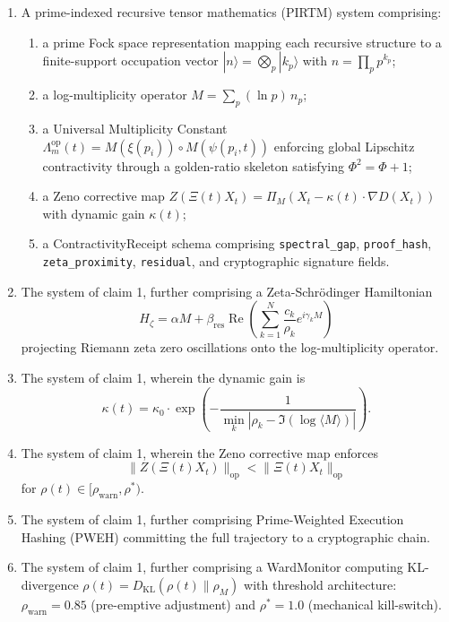 \documentclass[12pt]{article}
\theoremstyle{plain}
\theoremstyle{definition}
\theoremstyle{remark}
\begin{document}
\begin{enumerate}
    \item A prime-indexed recursive tensor mathematics (PIRTM) system comprising:
    \begin{enumerate}
        \item a prime Fock space representation mapping each recursive structure to a finite-support occupation vector $|n\rangle = \bigotimes_{p} |k_p\rangle$ with $n = \prod_{p} p^{k_p}$;
        \item a log-multiplicity operator $M = \sum_{p} (\ln p)\, n_p$;
        \item a Universal Multiplicity Constant $\Lambda_m^{\text{op}}(t) = M(\xi(p_i)) \circ M(\psi(p_i, t))$ enforcing global Lipschitz contractivity through a golden-ratio skeleton satisfying $\Phi^2 = \Phi + 1$;
        \item a Zeno corrective map $Z(\Xi(t)X_t) = \Pi_M(X_t - \kappa(t)\cdot \nabla D(X_t))$ with dynamic gain $\kappa(t)$;
        \item a ContractivityReceipt schema comprising \texttt{spectral\_gap}, \texttt{proof\_hash}, \texttt{zeta\_proximity}, \texttt{residual}, and cryptographic signature fields.
    \end{enumerate}

    \item The system of claim 1, further comprising a Zeta-Schrödinger Hamiltonian
    \[
    H_\zeta = \alpha M + \beta_{\text{res}} \operatorname{Re}\left( \sum_{k=1}^N \frac{c_k}{\rho_k} e^{i\gamma_k M} \right)
    \]
    projecting Riemann zeta zero oscillations onto the log-multiplicity operator.

    \item The system of claim 1, wherein the dynamic gain is
    \[
    \kappa(t) = \kappa_0 \cdot \exp\left( -\frac{1}{\min_k |\rho_k - \Im(\log \langle M \rangle)|} \right).
    \]

    \item The system of claim 1, wherein the Zeno corrective map enforces
    \[
    \|Z(\Xi(t)X_t)\|_{\text{op}} < \|\Xi(t)X_t\|_{\text{op}}
    \]
    for $\rho(t) \in [\rho_{\text{warn}}, \rho^*)$.

    \item The system of claim 1, further comprising Prime-Weighted Execution Hashing (PWEH) committing the full trajectory to a cryptographic chain.

    \item The system of claim 1, further comprising a WardMonitor computing KL-divergence $\rho(t) = D_{\text{KL}}(\rho(t) \| \rho_M)$ with threshold architecture: $\rho_{\text{warn}} = 0.85$ (pre-emptive adjustment) and $\rho^* = 1.0$ (mechanical kill-switch).
\end{enumerate}
\end{document}
